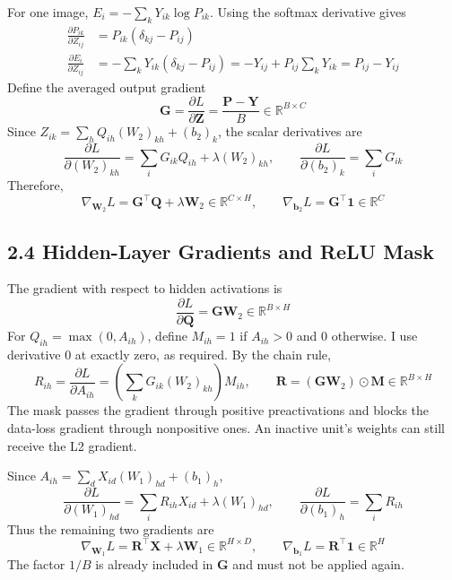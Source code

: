 \documentclass[a4paper,12pt]{article}
\begin{document}
For one image, \(E_i=-\sum_kY_{ik}\log P_{ik}\). Using the softmax derivative gives \[
\begin{aligned}
\frac{\partial P_{ik}}{\partial Z_{ij}}&=P_{ik}(\delta_{kj}-P_{ij})\\
\frac{\partial E_i}{\partial Z_{ij}}
&=-\sum_kY_{ik}(\delta_{kj}-P_{ij})
=-Y_{ij}+P_{ij}\sum_kY_{ik}=P_{ij}-Y_{ij}
\end{aligned}
\] Define the averaged output gradient \[
\boldsymbol{G}=\frac{\partial L}{\partial\boldsymbol{Z}}
=\frac{\boldsymbol{P}-\boldsymbol{Y}}{B}\in\mathbb{R}^{B\times C}
\] Since \(Z_{ik}=\sum_hQ_{ih}(W_2)_{kh}+(b_2)_k\), the scalar derivatives are \[
\frac{\partial L}{\partial(W_2)_{kh}}=\sum_iG_{ik}Q_{ih}+\lambda(W_2)_{kh},\qquad
\frac{\partial L}{\partial(b_2)_k}=\sum_iG_{ik}
\] Therefore, \[
\boxed{\nabla_{\boldsymbol{W}_2}L=\boldsymbol{G}^\top\boldsymbol{Q}+\lambda\boldsymbol{W}_2}
\in\mathbb{R}^{C\times H},\qquad
\boxed{\nabla_{\boldsymbol{b}_2}L=\boldsymbol{G}^\top\boldsymbol{1}}
\in\mathbb{R}^{C}
\]

\subsection*{2.4 Hidden-Layer Gradients and ReLU Mask}

The gradient with respect to hidden activations is \[
\frac{\partial L}{\partial\boldsymbol{Q}}=\boldsymbol{G}\boldsymbol{W}_2
\in\mathbb{R}^{B\times H}
\] For \(Q_{ih}=\max(0,A_{ih})\), define \(M_{ih}=1\) if \(A_{ih}>0\) and 0 otherwise. I use derivative 0 at exactly zero, as required. By the chain rule, \[
R_{ih}=\frac{\partial L}{\partial A_{ih}}
=\left(\sum_kG_{ik}(W_2)_{kh}\right)M_{ih},\qquad
\boldsymbol{R}=(\boldsymbol{G}\boldsymbol{W}_2)\odot\boldsymbol{M}
\in\mathbb{R}^{B\times H}
\] The mask passes the gradient through positive preactivations and blocks the data-loss gradient through nonpositive ones. An inactive unit's weights can still receive the L2 gradient.

Since \(A_{ih}=\sum_dX_{id}(W_1)_{hd}+(b_1)_h\), \[
\frac{\partial L}{\partial(W_1)_{hd}}=\sum_iR_{ih}X_{id}+\lambda(W_1)_{hd},\qquad
\frac{\partial L}{\partial(b_1)_h}=\sum_iR_{ih}
\] Thus the remaining two gradients are \[
\boxed{\nabla_{\boldsymbol{W}_1}L=\boldsymbol{R}^\top\boldsymbol{X}+\lambda\boldsymbol{W}_1}
\in\mathbb{R}^{H\times D},\qquad
\boxed{\nabla_{\boldsymbol{b}_1}L=\boldsymbol{R}^\top\boldsymbol{1}}
\in\mathbb{R}^{H}
\] The factor \(1/B\) is already included in \(\boldsymbol{G}\) and must not be applied again.
\end{document}
